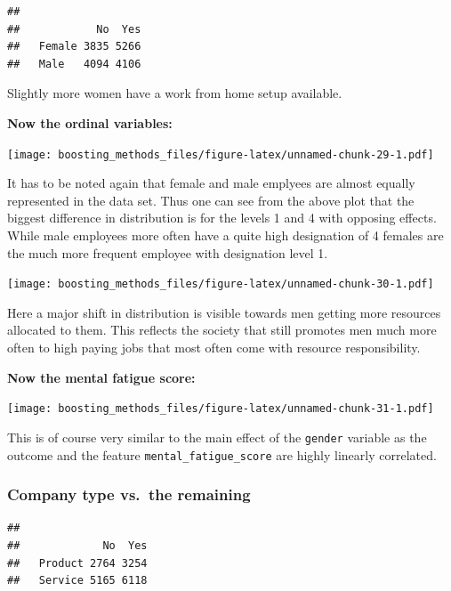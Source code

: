 \documentclass[
]{book}
\newenvironment{Shaded}{\begin{snugshade}}{\end{snugshade}}
\newcommand{\CommentTok}[1]{\textcolor[rgb]{0.56,0.35,0.01}{\textit{#1}}}
\newcommand{\FunctionTok}[1]{\textcolor[rgb]{0.00,0.00,0.00}{#1}}
\newcommand{\NormalTok}[1]{#1}
\newcommand{\SpecialCharTok}[1]{\textcolor[rgb]{0.00,0.00,0.00}{#1}}
\begin{document}
\begin{verbatim}
##         
##            No  Yes
##   Female 3835 5266
##   Male   4094 4106
\end{verbatim}

Slightly more women have a work from home setup available.

\textbf{Now the ordinal variables:}

\texttt{[image: boosting\_methods\_files/figure-latex/unnamed-chunk-29-1.pdf]}

It has to be noted again that female and male emplyees are almost equally represented in the data set. Thus one can see from the above plot that the biggest difference in distribution is for the levels 1 and 4 with opposing effects. While male employees more often have a quite high designation of 4 females are the much more frequent employee with designation level 1.

\texttt{[image: boosting\_methods\_files/figure-latex/unnamed-chunk-30-1.pdf]}

Here a major shift in distribution is visible towards men getting more resources allocated to them. This reflects the society that still promotes men much more often to high paying jobs that most often come with resource responsibility.

\textbf{Now the mental fatigue score:}

\texttt{[image: boosting\_methods\_files/figure-latex/unnamed-chunk-31-1.pdf]}

This is of course very similar to the main effect of the \texttt{gender} variable as the outcome and the feature \texttt{mental\_fatigue\_score} are highly linearly correlated.

\hypertarget{company-type-vs.-the-remaining}{%
\subsubsection{Company type vs.~the remaining}\label{company-type-vs.-the-remaining}}

\begin{Shaded}
\end{Shaded}

\begin{verbatim}
##          
##             No  Yes
##   Product 2764 3254
##   Service 5165 6118
\end{verbatim}
\end{document}
